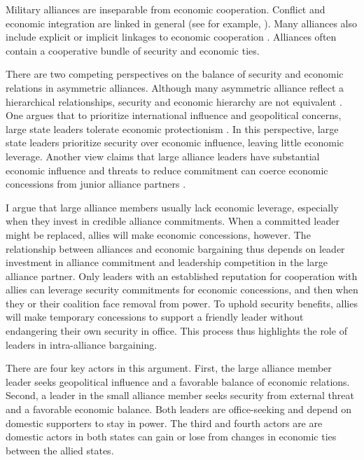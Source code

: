 \documentclass[12pt]{article}
\begin{document}
Military alliances are inseparable from economic cooperation.
Conflict and economic integration are linked in general (see for example, \citep{GartzkeLi2003, Chen2021}).
Many alliances also include explicit or implicit linkages to economic cooperation \citep{GowaMansfield2004, LongLeeds2006, Davis2008, Poast2012}. 
Alliances often contain a cooperative bundle of security and economic ties. 


There are two competing perspectives on the balance of security and economic relations in asymmetric alliances.
Although many asymmetric alliance reflect a hierarchical relationships, security and economic hierarchy are not equivalent \citep{Lake2009}. 
One argues that to prioritize international influence and geopolitical concerns, large state leaders tolerate economic protectionism \citep{Drezner2013, WolfordKim2017}. 
In this perspective, large state leaders prioritize security over economic influence, leaving little economic leverage. 
Another view claims that large alliance leaders have substantial economic influence \citep{Norrlof2010} and threats to reduce commitment can coerce economic concessions from junior alliance partners \citep{Oatley2015}.  


I argue that large alliance members usually lack economic leverage, especially when they invest in credible alliance commitments.
When a committed leader might be replaced, allies will make economic concessions, however. 
The relationship between alliances and economic bargaining thus depends on leader investment in alliance commitment and leadership competition in the large alliance partner.  
Only leaders with an established reputation for cooperation with allies can leverage security commitments for economic concessions, and then when they or their coalition face removal from power. 
To uphold security benefits, allies will make temporary concessions to support a friendly leader without endangering their own security in office. 
This process thus highlights the role of leaders in intra-alliance bargaining. 


There are four key actors in this argument. 
First, the large alliance member leader seeks geopolitical influence and a favorable balance of economic relations. 
Second, a leader in the small alliance member seeks security from external threat and a favorable economic balance.
Both leaders are office-seeking and depend on domestic supporters to stay in power.
The third and fourth actors are are domestic actors in both states can gain or lose from changes in economic ties between the allied states. 
\end{document}
